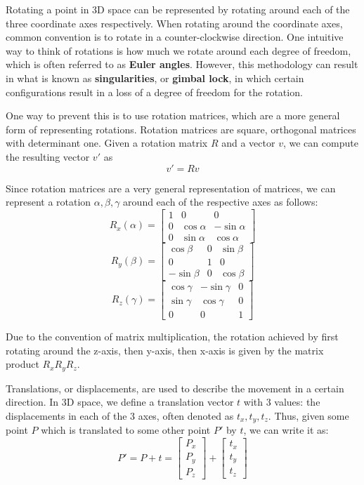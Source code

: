 \documentclass[a4paper, 12pt]{article}
\renewcommand\emph{\textbf}
\begin{document}
Rotating a point in 3D space can be represented by rotating around each of the three coordinate axes respectively. When rotating around the coordinate axes, common convention is to rotate in a counter-clockwise direction. One intuitive way to think of rotations is how much we rotate around each degree of freedom, which is often referred to as \emph{Euler angles}. However, this methodology can result in what is known as \emph{singularities}, or \emph{gimbal lock}, in which certain configurations result in a loss of a degree of freedom for the rotation. 

One way to prevent this is to use rotation matrices, which are a more general form of representing rotations. Rotation matrices are square, orthogonal matrices with determinant one. Given a rotation matrix $R$ and a vector $v$, we can compute the resulting vector $v'$ as
\[v' = Rv\]

Since rotation matrices are a very general representation of matrices, we can represent a rotation $\alpha, \beta, \gamma$ around each of the respective axes as follows:
\[R_x(\alpha) = \begin{bmatrix}1 & 0 & 0\\ 0 &\cos\alpha &-\sin\alpha \\ 0 &\sin\alpha &\cos\alpha \end{bmatrix}\]
\[R_y(\beta) = \begin{bmatrix}\cos\beta & 0 & \sin\beta \\ 0 & 1 & 0 \\ -\sin\beta & 0 &\cos\beta \end{bmatrix}\]
\[R_z(\gamma) = \begin{bmatrix}\cos \gamma & -\sin\gamma &0 \\ \sin\gamma &\cos\gamma & 0 \\ 0 & 0 & 1 \end{bmatrix}\]

Due to the convention of matrix multiplication, the rotation achieved by first rotating around the z-axis, then y-axis, then x-axis is given by the matrix product $R_xR_yR_z$.

Translations, or displacements, are used to describe the movement in a certain direction. In 3D space, we define a translation vector $t$ with 3 values: the displacements in each of the 3 axes, often denoted as $t_x, t_y, t_z$. Thus, given some point $P$ which is translated to some other point $P'$ by $t$, we can write it as:
\[ P' = P + t = \begin{bmatrix}P_x\\P_y\\P_z\end{bmatrix} + \begin{bmatrix}t_x\\t_y\\t_z\end{bmatrix}\]
\end{document}

